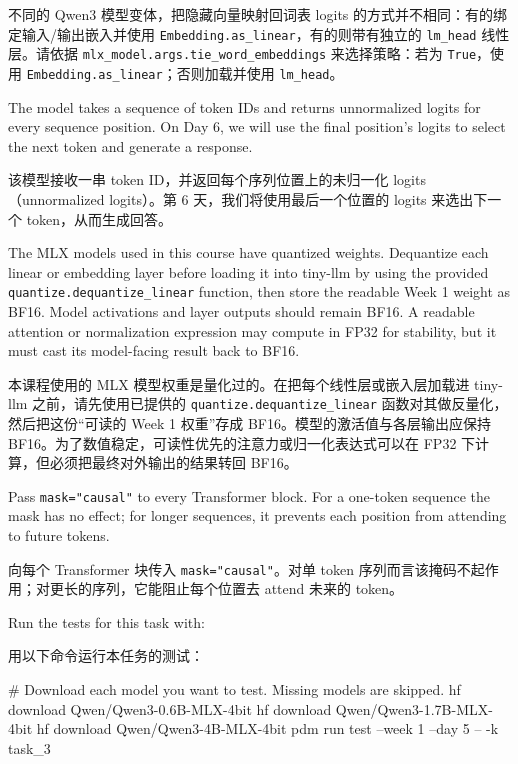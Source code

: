 \documentclass[11pt,a4paper]{article}
\newenvironment{zhpar}{%
  \par\smallskip\begingroup\color{zhcolor}\small\ignorespaces%
}{\endgroup\par\smallskip}
\begin{document}
\begin{zhpar}
不同的 Qwen3 模型变体，把隐藏向量映射回词表 logits 的方式并不相同：有的绑定输入/输出嵌入并使用 \texttt{Embedding.as\_linear}，有的则带有独立的 \texttt{lm\_head} 线性层。请依据 \texttt{mlx\_model.args.tie\_word\_embeddings} 来选择策略：若为 \texttt{True}，使用 \texttt{Embedding.as\_linear}；否则加载并使用 \texttt{lm\_head}。
\end{zhpar}
The model takes a sequence of token IDs and returns unnormalized logits for every sequence position. On Day 6, we will use the final position's logits to select the next token and generate a response.

\begin{zhpar}
该模型接收一串 token ID，并返回每个序列位置上的未归一化 logits（unnormalized logits）。第 6 天，我们将使用最后一个位置的 logits 来选出下一个 token，从而生成回答。
\end{zhpar}
The MLX models used in this course have quantized weights. Dequantize each linear or embedding layer before loading it into tiny-llm by using the provided \texttt{quantize.dequantize\_linear} function, then store the readable Week 1 weight as BF16. Model activations and layer outputs should remain BF16. A readable attention or normalization expression may compute in FP32 for stability, but it must cast its model-facing result back to BF16.

\begin{zhpar}
本课程使用的 MLX 模型权重是量化过的。在把每个线性层或嵌入层加载进 tiny-llm 之前，请先使用已提供的 \texttt{quantize.dequantize\_linear} 函数对其做反量化，然后把这份“可读的 Week 1 权重”存成 BF16。模型的激活值与各层输出应保持 BF16。为了数值稳定，可读性优先的注意力或归一化表达式可以在 FP32 下计算，但必须把最终对外输出的结果转回 BF16。
\end{zhpar}
Pass \texttt{mask="causal"} to every Transformer block. For a one-token sequence the mask has no effect; for longer sequences, it prevents each position from attending to future tokens.

\begin{zhpar}
向每个 Transformer 块传入 \texttt{mask="causal"}。对单 token 序列而言该掩码不起作用；对更长的序列，它能阻止每个位置去 attend 未来的 token。
\end{zhpar}
Run the tests for this task with:

\begin{zhpar}
用以下命令运行本任务的测试：
\end{zhpar}
\begin{codeblock}
# Download each model you want to test. Missing models are skipped.
hf download Qwen/Qwen3-0.6B-MLX-4bit
hf download Qwen/Qwen3-1.7B-MLX-4bit
hf download Qwen/Qwen3-4B-MLX-4bit
pdm run test --week 1 --day 5 -- -k task_3
\end{codeblock}
\end{document}
